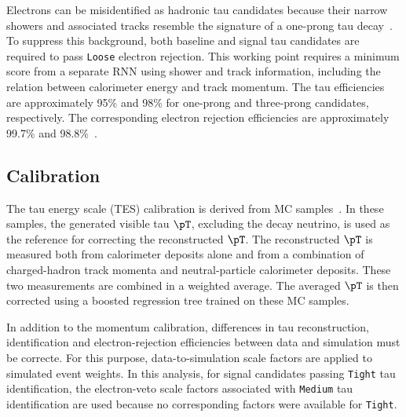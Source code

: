 Electrons can be misidentified as hadronic tau candidates because their narrow showers and associated tracks resemble the signature of a one-prong tau decay~\cite{ATLAS2022TauR22}.
To suppress this background, both baseline and signal tau candidates are required to pass \texttt{Loose} electron rejection.
This working point requires a minimum score from a separate RNN using shower and track information, including the relation between calorimeter energy and track momentum.
The tau efficiencies are approximately 95\% and 98\% for one-prong and three-prong candidates, respectively.
The corresponding electron rejection efficiencies are approximately 99.7\% and 98.8\%~\cite{ATLAS2022TauR22}.

\subsection{Calibration}

The tau energy scale (TES) calibration is derived from MC samples~\cite{ATLAS2022TauR22}.
In these samples, the generated visible tau $\pT$, excluding the decay neutrino, is used as the reference for correcting the reconstructed $\pT$.
The reconstructed $\pT$ is measured both from calorimeter deposits alone and from a combination of charged-hadron track momenta and neutral-particle calorimeter deposits.
These two measurements are combined in a weighted average.
The averaged $\pT$ is then corrected using a boosted regression tree trained on these MC samples.

In addition to the momentum calibration, differences in tau reconstruction, identification and electron-rejection efficiencies between data and simulation must be correcte.
For this purpose, data-to-simulation scale factors are applied to simulated event weights.
In this analysis, for signal candidates passing \texttt{Tight} tau identification, the electron-veto scale factors associated with \texttt{Medium} tau identification are used because no corresponding factors were available for \texttt{Tight}.
